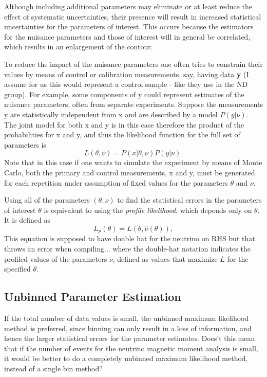 Although including additional parameters may eliminate or at least reduce the effect of systematic uncertainties, their presence will result in increased statistical uncertainties for the parameters of interest. This occurs because the estimators for the nuisance parameters and those of interest will in general be correlated, which results in an enlargement of the contour.

To reduce the impact of the nuisance parameters one often tries to constrain their values by means of control or calibration measurements, say, having data \textbf{y} (I assume for us this would represent a control sample - like they use in the ND group). For example, some components of y could represent estimates of the nuisance parameters, often from separate experiments. Suppose the measurements y are statistically independent from x and are described by a model $P\left(y|\nu\right)$. The joint model for both x and y is in this case therefore the product of the probabilities for x
and y, and thus the likelihood function for the full set of parameters is
\begin{equation}
L\left(\theta,\nu\right)=P\left(x|\theta,\nu\right)P\left(y|\nu\right).
\end{equation}
Note that in this case if one wants to simulate the experiment by means of Monte Carlo, both the primary and control measurements, x and y, must be generated for each repetition under assumption of fixed values for the parameters $\theta$ and $\nu$.

Using all of the parameters $\left(\theta,\nu\right)$  to find the statistical errors in the parameters of interest $\theta$ is equivalent to using the \textit{profile likelihood}, which depends only on $\theta$. It is defined as
\begin{equation}
L_p\left(\theta\right)=L\left(\theta,\hat{\nu}\left(\theta\right)\right),
\end{equation}
This equation is supposed to have double hat for the neutrino on RHS but that throws an error when compiling...
where the double-hat notation indicates the profiled values of the parameters $\nu$, defined as values that maximize $L$ for the specified $\theta$.

\subsection{Unbinned Parameter Estimation}
If the total number of data values is small, the unbinned maximum likelihood method is preferred, since binning can only result in a loss of information, and hence the larger statistical errors for the parameter estimates.
Does't this mean that if the number of events for the neutrino magnetic moment analysis is small, it would be better to do a completely unbinned maximum likelihood method, instead of a single bin method?


